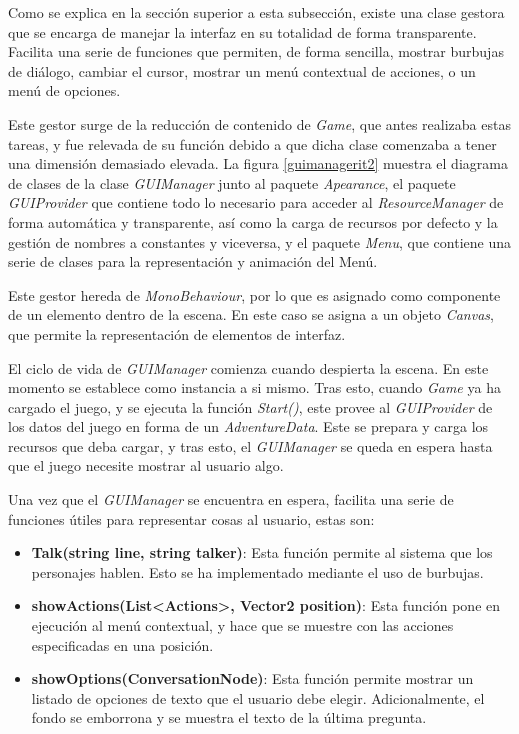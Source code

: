 Como se explica en la sección superior a esta subsección, existe una clase gestora que se encarga de manejar la interfaz en su totalidad de forma transparente. Facilita una serie de funciones que permiten, de forma sencilla, mostrar burbujas de diálogo, cambiar el cursor, mostrar un menú contextual de acciones, o un menú de opciones.

Este gestor surge de la reducción de contenido de \textit{Game}, que antes realizaba estas tareas, y fue relevada de su función debido a que dicha clase comenzaba a tener una dimensión demasiado elevada. La figura \ref{guimanagerit2} muestra el diagrama de clases de la clase \textit{GUIManager} junto al paquete \textit{Apearance}, el paquete \textit{GUIProvider} que contiene todo lo necesario para acceder al \textit{ResourceManager} de forma automática y transparente, así como la carga de recursos por defecto y la gestión de nombres a constantes y viceversa, y el paquete \textit{Menu}, que contiene una serie de clases para la representación y animación del Menú.

Este gestor hereda de \textit{MonoBehaviour}, por lo que es asignado como componente de un elemento dentro de la escena. En este caso se asigna a un objeto \textit{Canvas}, que permite la representación de elementos de interfaz. 

El ciclo de vida de \textit{GUIManager} comienza cuando despierta la escena. En este momento se establece como instancia a si mismo. Tras esto, cuando \textit{Game} ya ha cargado el juego, y se ejecuta la función \textit{Start()}, este provee al \textit{GUIProvider} de los datos del juego en forma de un \textit{AdventureData}. Este se prepara y carga los recursos que deba cargar, y tras esto, el \textit{GUIManager} se queda en espera hasta que el juego necesite mostrar al usuario algo.

Una vez que el \textit{GUIManager} se encuentra en espera, facilita una serie de funciones útiles para representar cosas al usuario, estas son:
\begin{itemize}
	\item \textbf{Talk(string line, string talker)}: Esta función permite al sistema que los personajes hablen. Esto se ha implementado mediante el uso de burbujas.
	
	\item \textbf{showActions(List<Actions>, Vector2 position)}: Esta función pone en ejecución al menú contextual, y hace que se muestre con las acciones especificadas en una posición.
	
	\item \textbf{showOptions(ConversationNode)}: Esta función permite mostrar un listado de opciones de texto que el usuario debe elegir. Adicionalmente, el fondo se emborrona y se muestra el texto de la última pregunta.
	
\end{itemize}


